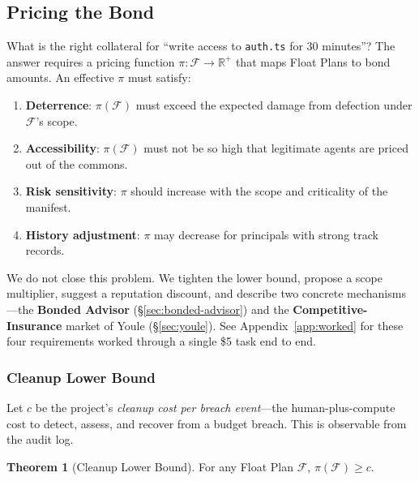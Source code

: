\documentclass[11pt,a4paper]{article}
\theoremstyle{definition}
\newtheorem{theorem}{Theorem}[section]
\theoremstyle{remark}
\begin{document}
\subsection{Pricing the Bond}\label{sec:pricing}

What is the right collateral for ``write access to \texttt{auth.ts} for 30 minutes''? The answer requires a pricing function $\pi: \mathcal{F} \rightarrow \mathbb{R}^{+}$ that maps Float Plans to bond amounts. An effective $\pi$ must satisfy:

\begin{enumerate}[nosep]
  \item \textbf{Deterrence}: $\pi(\mathcal{F})$ must exceed the expected damage from defection under $\mathcal{F}$'s scope.
  \item \textbf{Accessibility}: $\pi(\mathcal{F})$ must not be so high that legitimate agents are priced out of the commons.
  \item \textbf{Risk sensitivity}: $\pi$ should increase with the scope and criticality of the manifest.
  \item \textbf{History adjustment}: $\pi$ may decrease for principals with strong track records.
\end{enumerate}

We do not close this problem. We tighten the lower bound, propose a scope multiplier, suggest a reputation discount, and describe two concrete mechanisms---the \textbf{Bonded Advisor} (\S\ref{sec:bonded-advisor}) and the \textbf{Competitive-Insurance} market of Youle (\S\ref{sec:youle}). See Appendix~\ref{app:worked} for these four requirements worked through a single \$5 task end to end.

\subsubsection{Cleanup Lower Bound}\label{sec:cleanup-bound}

Let $c$ be the project's \emph{cleanup cost per breach event}---the human-plus-compute cost to detect, assess, and recover from a budget breach. This is observable from the audit log.

\begin{theorem}[Cleanup Lower Bound]\label{thm:cleanup-bound}
For any Float Plan $\mathcal{F}$, $\pi(\mathcal{F}) \geq c$.
\end{theorem}
\end{document}
